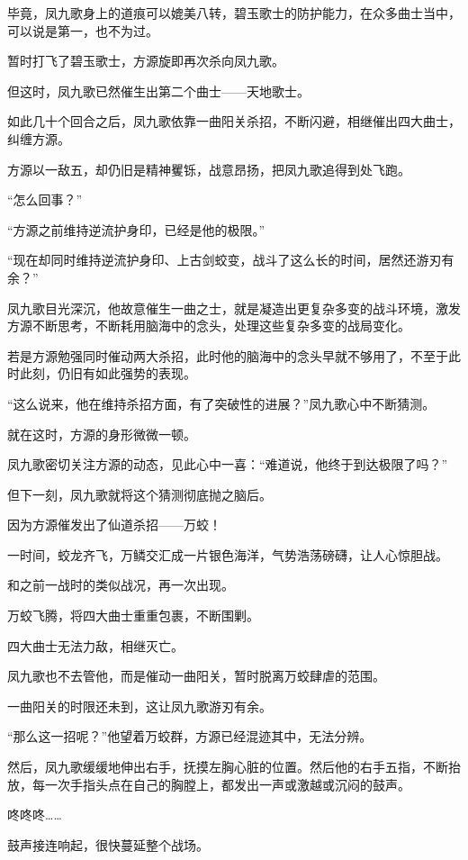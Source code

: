 \begin{this_body}
毕竟，凤九歌身上的道痕可以媲美八转，碧玉歌士的防护能力，在众多曲士当中，可以说是第一，也不为过。

暂时打飞了碧玉歌士，方源旋即再次杀向凤九歌。

但这时，凤九歌已然催生出第二个曲士——天地歌士。

如此几十个回合之后，凤九歌依靠一曲阳关杀招，不断闪避，相继催出四大曲士，纠缠方源。

方源以一敌五，却仍旧是精神矍铄，战意昂扬，把凤九歌追得到处飞跑。

“怎么回事？”

“方源之前维持逆流护身印，已经是他的极限。”

“现在却同时维持逆流护身印、上古剑蛟变，战斗了这么长的时间，居然还游刃有余？”

凤九歌目光深沉，他故意催生一曲之士，就是凝造出更复杂多变的战斗环境，激发方源不断思考，不断耗用脑海中的念头，处理这些复杂多变的战局变化。

若是方源勉强同时催动两大杀招，此时他的脑海中的念头早就不够用了，不至于此时此刻，仍旧有如此强势的表现。

“这么说来，他在维持杀招方面，有了突破性的进展？”凤九歌心中不断猜测。

就在这时，方源的身形微微一顿。

凤九歌密切关注方源的动态，见此心中一喜：“难道说，他终于到达极限了吗？”

但下一刻，凤九歌就将这个猜测彻底抛之脑后。

因为方源催发出了仙道杀招——万蛟！

一时间，蛟龙齐飞，万鳞交汇成一片银色海洋，气势浩荡磅礴，让人心惊胆战。

和之前一战时的类似战况，再一次出现。

万蛟飞腾，将四大曲士重重包裹，不断围剿。

四大曲士无法力敌，相继灭亡。

凤九歌也不去管他，而是催动一曲阳关，暂时脱离万蛟肆虐的范围。

一曲阳关的时限还未到，这让凤九歌游刃有余。

“那么这一招呢？”他望着万蛟群，方源已经混迹其中，无法分辨。

然后，凤九歌缓缓地伸出右手，抚摸左胸心脏的位置。然后他的右手五指，不断抬放，每一次手指头点在自己的胸膛上，都发出一声或激越或沉闷的鼓声。

咚咚咚……

鼓声接连响起，很快蔓延整个战场。


\end{this_body}

